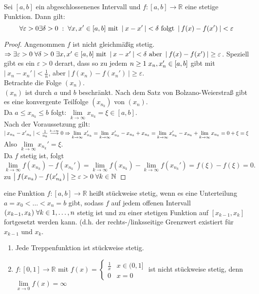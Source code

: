 \documentclass[a4paper,titlepage,oneside]{article}
\def\N{\ensuremath{\mathbb{N}} }
\def\R{\ensuremath{\mathbb{R}} }
\renewcommand{\epsilon}{\ensuremath{\varepsilon} }
\def\WSP{\text{Widerspruch! }}
\def\fa{\ensuremath{\forall}}
\def\sp{\hspace{0,1cm}}
\renewcommand{\liminf}[2][n]{\ensuremath{\lim\limits_{#1 \rightarrow \infty}{#2}}}
\newcommand{\limnull}[2][n]{\ensuremath{\lim\limits_{#1 \rightarrow 0}{#2}}}
\newcommand{\abs}[1]{\ensuremath{\left|\:#1\:\right|}}
\newcommand{\longtoinf}[1][n]{\ensuremath{\overset{\scriptscriptstyle{#1 \to \infty}}{\longrightarrow}}}
\theoremstyle{thmstyle}
\begin{document}
\begin{satz}
Sei $[a,b]$ ein abgeschlossenenes Intervall und $ f: [a,b] \to \R $ eine stetige Funktion. Dann gilt:
\[\forall \epsilon > 0 \exists \delta > 0 \sp: \sp \forall x, x' \in [a,b] \text{ mit } \abs{x- x'} < \delta \text{ folgt } \abs{f(x) - f(x')} < \epsilon\]
\begin{proof}
Angenommen $f$ ist nicht gleichmäßig stetig. $\Rightarrow \exists \epsilon > 0 \sp \forall \delta > 0 \sp \exists x,x' \in [a,b] \text{ mit } \abs{x- x'} < \delta \text{ aber } \abs{f(x) - f(x')} \ge \epsilon$. Speziell gibt es ein $\epsilon > 0$ derart, dass so zu jedem $n \ge 1 \sp x_n, x_n' \in [a,b] $ gibt mit $\abs{x_n - x_n'} < \frac{1}{n}$, aber $\abs{f(x_n) - f(x_n')} \ge \epsilon$.\\
Betrachte die Folge $(x_n)$.\\
$(x_n)$ ist durch $a$ und $b$ beschränkt. Nach dem Satz von Bolzano-Weierstraß gibt es eine konvergente Teilfolge $(x_{n_k})$ von $(x_n)$.\\
Da $a \le x_{n_k} \le b$ folgt: $\liminf[k]{x_{n_k}} = \xi \in [a,b]$.\\
Nach der Voraussetzung gilt:
$\abs{x_{n_k} - {x'}_{n_k}} < \frac{1}{n_k} \longtoinf[k] 0\\
\Rightarrow \liminf[k]{x_{n_k}'} = \liminf[k]{x_{n_k}' - x_{n_k} + x_{n_k}} =  \liminf[k]{x_{n_k}' - x_{n_k}} + \liminf[k]{x_{n_k}} = 0 + \xi = \xi$\\
Also  $\liminf[k]{x_{n_k}'} = \xi$.\\
Da $f$ stetig ist, folgt $\liminf[k]{f(x_{n_k}) - f(x_{n_k}')} = \liminf[k]{f(x_{n_k})} - \liminf[k]{f(x_{n_k}')} = f(\xi) - f(\xi) = 0. $\\
\WSP zu $\abs{f(x_{n_k}) - f(x_{n_k}')} \ge \epsilon > 0 \sp \forall k \in \N$
\end{proof}
\end{satz}

\begin{defi}
eine Funktion $f: [a,b] \to \R$ heißt stückweise stetig, wenn es eine Unterteilung $a = x_0 < \dots < x_n = b$ gibt, sodass $f$ auf jedem offenen Intervall $(x_{k-1}, x_k)  \sp \fa k \in {1, \dots, n} $ stetig ist und zu einer stetigen Funktion auf $[x_{k-1}, x_k]$ fortgesetzt werden kann. (d.h. der rechts-/linksseitige Grenzwert existiert für $x_{k-1}$ und $x_k$.
\end{defi}

\begin{bsp}
\begin{enumerate}
\item Jede Treppenfunktion ist stückweise stetig.
\item $f:[0,1] \to \R$ mit $f(x) = \begin{cases} \frac{1}{x} & x \in(0,1]\\ 0 & x = 0\end{cases}$ ist nicht stückweise stetig, denn $\limnull[x]{f(x)} = \infty$
\end{enumerate}
\end{bsp}
\end{document}
